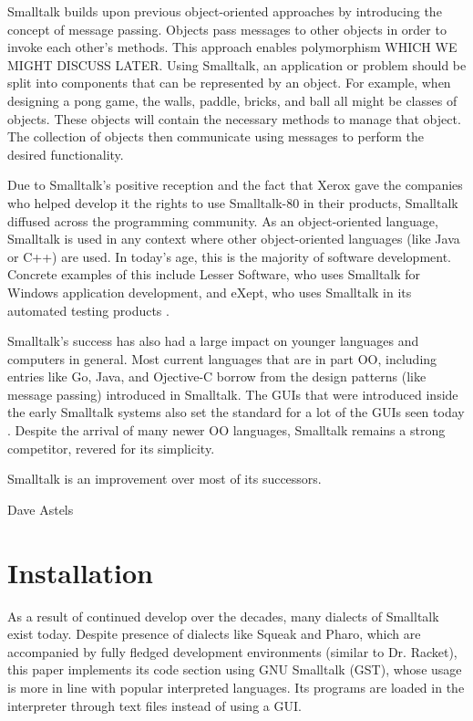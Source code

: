 Smalltalk builds upon previous object-oriented approaches by introducing the concept of message passing. Objects pass messages to other objects in order to invoke each other's methods. This approach enables polymorphism WHICH WE MIGHT DISCUSS LATER. Using Smalltalk, an application or problem should be split into components that can be represented by an object. For example, when designing a pong game, the walls, paddle, bricks, and ball all might be classes of objects. These objects will contain the necessary methods to manage that object. The collection of objects then communicate using messages to perform the desired functionality.

Due to Smalltalk's positive reception and the fact that Xerox gave the companies who helped develop it the rights to use Smalltalk-80 in their products, Smalltalk diffused across the programming community. As an object-oriented language, Smalltalk is used in any context where other object-oriented languages  (like Java or C++) are used. In today's age, this is the majority of software development. Concrete examples of this include Lesser Software, who uses Smalltalk for Windows application development, and eXept, who uses Smalltalk in its automated testing products \cite{exept} \cite{lesser}.

Smalltalk's success has also had a large impact on younger languages and computers in general. Most current languages that are in part OO, including entries like Go, Java, and Ojective-C borrow from the design patterns (like message passing) introduced in Smalltalk. The GUIs that were introduced inside the early Smalltalk systems also set the standard for a lot of the GUIs seen today \cite{influence}. Despite the arrival of many newer OO languages, Smalltalk remains a strong competitor, revered for its simplicity. 

\begin{center}
Smalltalk is an improvement over most of its successors.
\end{center}

\begin{flushright}Dave Astels \cite{dave}\end{flushright}




\section{Installation}

As a result of continued develop over the decades, many dialects of Smalltalk exist today. Despite presence of dialects like Squeak and Pharo, which are accompanied by fully fledged development environments (similar to Dr. Racket), this paper implements its code section using GNU Smalltalk (GST), whose usage is more in line with popular interpreted languages. Its programs are loaded in the interpreter through text files instead of using a GUI.

